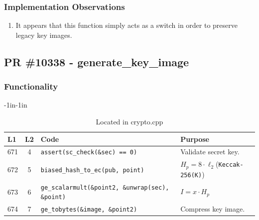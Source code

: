 \documentclass[12pt,titlepage,table]{article}
\begin{document}
\subsubsection{Implementation Observations}
\begin{enumerate}
    \item It appears that this function simply acts as a switch in order to preserve legacy key images.
\end{enumerate}


\newpage
\subsection{PR \#10338 - generate\_key\_image}
\subsubsection{Functionality}


\begin{table}[htbp]
\caption{generate\_key\_image Source To Spec Map}
\begin{adjustwidth}{-1in}{-1in}
\centering
{
\begin{tabular}{| l | c | l | l |}
\hline
\textbf{L1} & \textbf{L2} & \textbf{Code} & \textbf{Purpose} \\
\hline
\hline
671 & 4 & \verb+assert(sc_check(&sec) == 0)+ & Validate secret key. \\
672 & 5 & \verb+biased_hash_to_ec(pub, point)+ & $H_p = 8 \cdot \ell_2$(\verb+Keccak-256(K)+) \\
673 & 6 & \verb+ge_scalarmult(&point2, &unwrap(sec), &point)+ & $I = x \cdot H_p$ \\
674 & 7 & \verb+ge_tobytes(&image, &point2)+ & Compress key image. \\
\hline
\end{tabular}}
\end{adjustwidth}
\caption*{Located in crypto.cpp}
\end{table}
\end{document}
